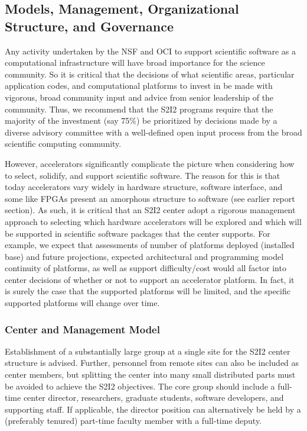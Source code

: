 \subsection{Models, Management, Organizational Structure, and Governance}
Any activity undertaken by the NSF and OCI to support scientific software as a computational infrastructure will have broad importance for the science community. So it is critical that the decisions of what scientific areas, particular application codes, and computational platforms to invest in be made with vigorous, broad community input and advice from senior leadership of the community. Thus, we recommend that the S2I2 programs require that the majority of the investment (say 75\%) be prioritized by decisions made by a diverse advisory committee with a well-defined open input process from the broad scientific computing community.

However, accelerators significantly complicate the picture when considering how to select, solidify, and support scientific software. The reason for this is that today accelerators vary widely in hardware structure, software interface, and some like FPGAs present an amorphous structure to software (see earlier report section). As such, it is critical that an S2I2 center adopt a rigorous management approach to selecting which hardware accelerators will be explored and which will be supported in scientific software packages that the center supports. For example, we expect that assessments of number of platforms deployed (installed base) and future projections, expected architectural and programming model continuity of platforms, as well as support difficulty/cost would all factor into center decisions of whether or not to support an accelerator platform. In fact, it is surely the case that the supported platforms will be limited, and the specific supported platforms will change over time.

\subsubsection{Center and Management Model}
Establishment of a substantially large group at a single site for the S2I2 center structure is advised. Further, personnel from remote sites can also be included as center members, but splitting the center into many small distributed parts must be avoided to achieve the S2I2 objectives. The core group should include a full-time center director, researchers, graduate students, software developers, and supporting staff. If applicable, the director position can alternatively be held by a (preferably tenured) part-time faculty member with a full-time deputy.

